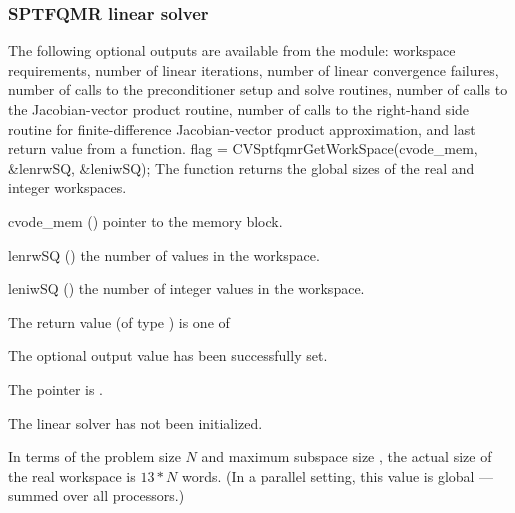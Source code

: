 
\subsubsection{SPTFQMR linear solver}\label{sss:optout_sptfqmr}
The following optional outputs are available from the {\cvsptfqmr}
module: workspace requirements, number of linear iterations, number of
linear convergence failures, number of calls to the preconditioner
setup and solve routines, number of calls to the Jacobian-vector
product routine, number of calls to the right-hand side routine for
finite-difference Jacobian-vector product approximation, and last
return value from a {\cvsptfqmr} function.
{
  flag = CVSptfqmrGetWorkSpace(cvode\_mem, \&lenrwSQ, \&leniwSQ);
}
{
  The function  returns the global sizes of the
  {\cvsptfqmr} real and integer workspaces.
}
{
  \begin{args}
  \item[cvode\_mem] ()
    pointer to the {\cvode} memory block.
  \item[lenrwSQ] ()
    the number of  values in the {\cvsptfqmr} workspace.
  \item[leniwSQ] ()
    the number of integer values in the {\cvsptfqmr} workspace.
  \end{args}
}
{
  The return value  (of type ) is one of
  \begin{args}
  \item[\Id{CVSPTFQMR\_SUCCESS}] 
    The optional output value has been successfully set.
  \item[\Id{CVSPTFQMR\_MEM\_NULL}]
    The  pointer is .
  \item[\Id{CVSPTFQMR\_LMEM\_NULL}]
    The {\cvsptfqmr} linear solver has not been initialized.
  \end{args}
}
{
  In terms of the problem size $N$ and maximum subspace size , 
  the actual size of the real workspace is $13*N$  words.
  (In a parallel setting, this value is global --- summed over all processors.)
}
